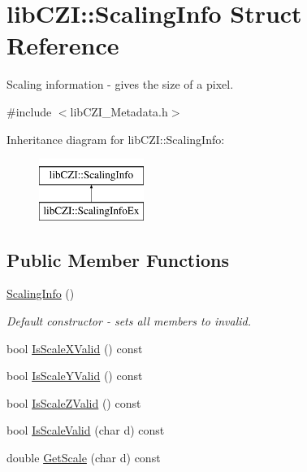 \hypertarget{structlib_c_z_i_1_1_scaling_info}{}\section{lib\+C\+ZI\+:\+:Scaling\+Info Struct Reference}
\label{structlib_c_z_i_1_1_scaling_info}


Scaling information -\/ gives the size of a pixel.  




{\ttfamily \#include $<$lib\+C\+Z\+I\+\_\+\+Metadata.\+h$>$}

Inheritance diagram for lib\+C\+ZI\+:\+:Scaling\+Info\+:\begin{figure}[H]
\begin{center}
\leavevmode
\includegraphics[height=2.000000cm]{structlib_c_z_i_1_1_scaling_info}
\end{center}
\end{figure}
\subsection*{Public Member Functions}
\begin{DoxyCompactItemize}
\item 
\mbox{\label{structlib_c_z_i_1_1_scaling_info_a5faab7e185b27b1154088631d83b6a0f}} 
\hyperlink{structlib_c_z_i_1_1_scaling_info_a5faab7e185b27b1154088631d83b6a0f}{Scaling\+Info} ()
\begin{DoxyCompactList}\small\item\em Default constructor -\/ sets all members to invalid. \end{DoxyCompactList}\item 
bool \hyperlink{structlib_c_z_i_1_1_scaling_info_acb5dd76b1a44cf4bef44e26ca48c8afe}{Is\+Scale\+X\+Valid} () const
\item 
bool \hyperlink{structlib_c_z_i_1_1_scaling_info_afa9e1621388bd169ab263671f6c44103}{Is\+Scale\+Y\+Valid} () const
\item 
bool \hyperlink{structlib_c_z_i_1_1_scaling_info_a9dcd0b6f35c61e3611a415691ff427a7}{Is\+Scale\+Z\+Valid} () const
\item 
bool \hyperlink{structlib_c_z_i_1_1_scaling_info_ac94956ea0d31786520641798ed76c556}{Is\+Scale\+Valid} (char d) const
\item 
double \hyperlink{structlib_c_z_i_1_1_scaling_info_ae6d9d5bef578048d6d0ca4ff0891d006}{Get\+Scale} (char d) const
\end{DoxyCompactItemize}
